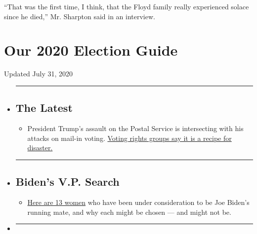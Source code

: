 ``That was the first time, I think, that the Floyd family really
experienced solace since he died,'' Mr. Sharpton said in an interview.

\hypertarget{our-2020-election-guide}{%
\section{Our 2020 Election Guide}\label{our-2020-election-guide}}

Updated July 31, 2020

\begin{itemize}
\item
  \begin{center}\rule{0.5\linewidth}{\linethickness}\end{center}

  \hypertarget{the-latest}{%
  \subsection{The Latest}\label{the-latest}}

  \begin{itemize}
  \tightlist
  \item
    President Trump's assault on the Postal Service is intersecting with
    his attacks on mail-in voting.
    \href{https://www.nytimes.com/2020/07/31/us/politics/trump-usps-mail-delays.html?action=click\&pgtype=Article\&state=default\&region=BELOW_MAIN_CONTENT\&context=storylines_guide}{Voting
    rights groups say it is a recipe for disaster.}
  \end{itemize}
\item
  \begin{center}\rule{0.5\linewidth}{\linethickness}\end{center}

  \hypertarget{bidens-vp-search}{%
  \subsection{Biden's V.P. Search}\label{bidens-vp-search}}

  \begin{itemize}
  \tightlist
  \item
    \href{https://www.nytimes.com/article/biden-vice-president-2020.html?action=click\&pgtype=Article\&state=default\&region=BELOW_MAIN_CONTENT\&context=storylines_guide}{Here
    are 13 women} who have been under consideration to be Joe Biden's
    running mate, and why each might be chosen --- and might not be.
  \end{itemize}
\item
  \begin{center}\rule{0.5\linewidth}{\linethickness}\end{center}


\end{itemize}
